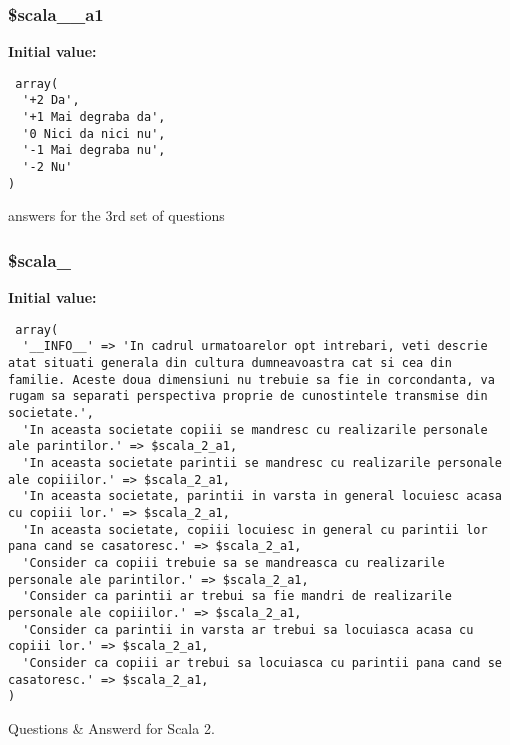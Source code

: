 \subsubsection{\setlength{\rightskip}{0pt plus 5cm}\$scala\_\_\-a1}\label{d1/d7c/a00003_c5683b1a8dd609e69d41c2d1dfe7c9bd}


\textbf{Initial value:}

\begin{Code}\begin{verbatim} array(
  '+2 Da', 
  '+1 Mai degraba da', 
  '0 Nici da nici nu', 
  '-1 Mai degraba nu', 
  '-2 Nu'
)
\end{verbatim}\end{Code}
answers for the 3rd set of questions 

\subsubsection{\setlength{\rightskip}{0pt plus 5cm}\$scala\_}\label{d1/d7c/a00003_5c618115ee8d252e44eff6f86810700c}


\textbf{Initial value:}

\begin{Code}\begin{verbatim} array(
  '__INFO__' => 'In cadrul urmatoarelor opt intrebari, veti descrie atat situati generala din cultura dumneavoastra cat si cea din familie. Aceste doua dimensiuni nu trebuie sa fie in corcondanta, va rugam sa separati perspectiva proprie de cunostintele transmise din societate.',
  'In aceasta societate copiii se mandresc cu realizarile personale ale parintilor.' => $scala_2_a1,
  'In aceasta societate parintii se mandresc cu realizarile personale ale copiiilor.' => $scala_2_a1,
  'In aceasta societate, parintii in varsta in general locuiesc acasa cu copiii lor.' => $scala_2_a1,
  'In aceasta societate, copiii locuiesc in general cu parintii lor pana cand se casatoresc.' => $scala_2_a1,
  'Consider ca copiii trebuie sa se mandreasca cu realizarile personale ale parintilor.' => $scala_2_a1,
  'Consider ca parintii ar trebui sa fie mandri de realizarile personale ale copiiilor.' => $scala_2_a1,
  'Consider ca parintii in varsta ar trebui sa locuiasca acasa cu copiii lor.' => $scala_2_a1,
  'Consider ca copiii ar trebui sa locuiasca cu parintii pana cand se casatoresc.' => $scala_2_a1,
)
\end{verbatim}\end{Code}
Questions \& Answerd for Scala 2. 

